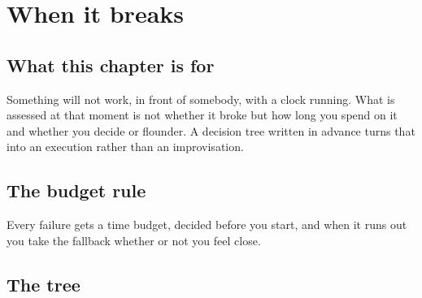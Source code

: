 \chapter{When it breaks}
\label{ch:breaks}

\section*{What this chapter is for}

Something will not work, in front of somebody, with a clock running. What is
assessed at that moment is not whether it broke but how long you spend on it
and whether you decide or flounder. A decision tree written in advance turns
that into an execution rather than an improvisation.

\section{The budget rule}

Every failure gets a time budget, decided before you start, and when it runs
out you take the fallback whether or not you feel close.


\section{The tree}

